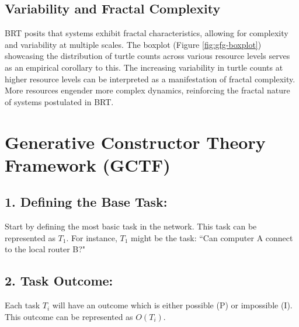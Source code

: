 \documentclass[sn-nature]{sn-jnl}%
\theoremstyle{thmstyleone}%
\theoremstyle{thmstyletwo}%
\theoremstyle{thmstylethree}%
\begin{document}

\subsection{Variability and Fractal Complexity}

BRT posits that systems exhibit fractal characteristics, allowing for complexity and variability at multiple scales. The boxplot (Figure \ref{fig:gfg-boxplot}) showcasing the distribution of turtle counts across various resource levels serves as an empirical corollary to this. The increasing variability in turtle counts at higher resource levels can be interpreted as a manifestation of fractal complexity. More resources engender more complex dynamics, reinforcing the fractal nature of systems postulated in BRT. \\




\section*{Generative Constructor Theory Framework (GCTF)}

\subsection*{1. Defining the Base Task:}
Start by defining the most basic task in the network. This task can be represented as $T_1$.
For instance, $T_1$ might be the task: ``Can computer A connect to the local router B?"

\subsection*{2. Task Outcome:}
Each task $T_i$ will have an outcome which is either possible (P) or impossible (I). This outcome can be represented as $O(T_i)$.
\end{document}
